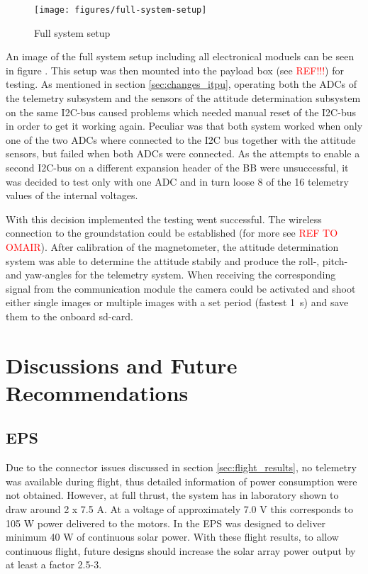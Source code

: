 \begin{figure}
\centering
\texttt{[image: figures/full-system-setup]}
\caption{Full system setup}
\label{fig:FlightTest1_1}
\end{figure}

An image of the full system setup including all electronical moduels can be seen in figure . This setup was then mounted into the payload box (see \textcolor{red}{REF!!!}) for testing. As mentioned in section \ref{sec:changes_itpu}, operating both the ADCs of the telemetry subsystem and the sensors of the attitude determination subsystem on the same I2C-bus caused problems which needed manual reset of the I2C-bus in order to get it working again. Peculiar was that both system worked when only one of the two ADCs where connected to the I2C bus together with the attitude sensors, but failed when both ADCs were connected. As the attempts to enable a second I2C-bus on a different expansion header of the BB were unsuccessful, it was decided to test only with one ADC and in turn loose 8 of the 16 telemetry values of the internal voltages. 

With this decision implemented the testing went successful. The wireless connection to the groundstation could be established (for more see \textcolor{red}{REF TO OMAIR}). After calibration of the magnetometer, the attitude determination system was able to determine the attitude stabily and produce the roll-, pitch- and yaw-angles for the telemetry system. When receiving the corresponding signal from the communication module the camera could be activated and shoot either single images or multiple images with a set period (fastest 1~s) and save them to the onboard sd-card.  

\section{Discussions and Future Recommendations}
%
\subsection{EPS}
Due to the connector issues discussed in section \ref{sec:flight_results}, no telemetry was available during flight, thus detailed information of power consumption were not obtained. However, at full thrust, the system has in laboratory shown to draw around 2 x 7.5 A. At a voltage of approximately 7.0 V this corresponds to 105 W power delivered to the motors. In \cite{CDR} the \ac{EPS} was designed to deliver minimum 40 W of continuous solar power. With these flight results, to allow continuous flight, future designs should increase the solar array power output by at least a factor 2.5-3.
 
